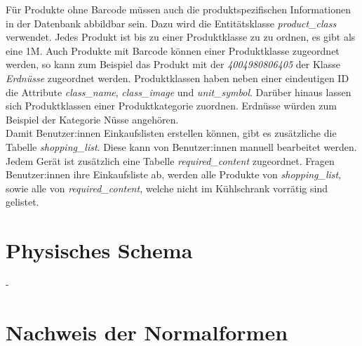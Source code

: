 Für Produkte ohne Barcode müssen auch die produktspezifischen Informationen in der Datenbank abbildbar sein. Dazu wird die Entitätsklasse \textit{product\_class} verwendet. Jedes Produkt ist bis zu einer Produktklasse zu zu ordnen, es gibt als eine \gls{1M}. Auch Produkte mit Barcode können einer Produktklasse zugeordnet werden, so kann zum Beispiel das Produkt mit der  \textit{4004980806405} der Klasse \textit{Erdnüsse} zugeordnet werden. Produktklassen haben neben einer eindeutigen ID die Attribute \textit{class\_name}, \textit{class\_image} und \textit{unit\_symbol}. Darüber hinaus lassen sich Produktklassen einer Produktkategorie zuordnen. Erdnüsse würden zum Beispiel der Kategorie Nüsse angehören.\\ Damit Benutzer:innen Einkaufslisten erstellen können, gibt es zusätzliche die Tabelle \textit{shopping\_list}. Diese kann von Benutzer:innen manuell bearbeitet werden. Jedem Gerät ist zusätzlich eine Tabelle \textit{required\_content} zugeordnet. Fragen Benutzer:innen ihre Einkaufsliste ab, werden alle Produkte von \textit{shopping\_list}, sowie alle von \textit{required\_content}, welche nicht im Kühlschrank vorrätig sind gelistet.

\section{Physisches Schema}\label{sec:Physisches Schema}

-


\section{Nachweis der Normalformen}\label{sec:Nachweis der Normalformen}
